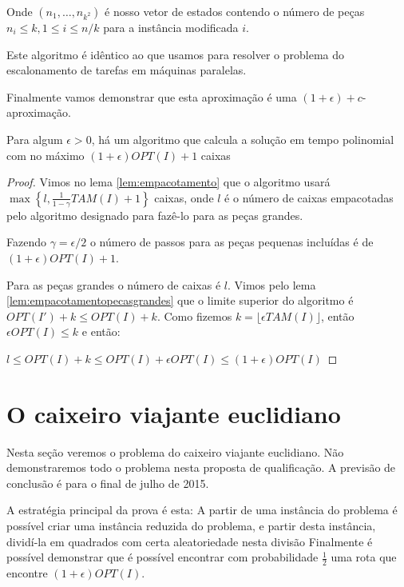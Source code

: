 Onde $(n_1, \ldots, n_{k^2})$ é nosso vetor de estados contendo o número de peças $n_i \leq k, 1 \leq i \leq n/k$ para a instância modificada $i$.

Este algoritmo é idêntico ao que usamos para resolver o problema do escalonamento de tarefas em máquinas paralelas.

Finalmente vamos demonstrar que esta aproximação é uma $(1+\epsilon) + c$-aproximação.

\begin{teorema}
Para algum $\epsilon > 0$, há um algoritmo que calcula a solução em tempo polinomial com no máximo $(1 + \epsilon) OPT(I) + 1$ caixas
\end{teorema}

\begin{proof}
Vimos no lema \ref{lem:empacotamento} que o algoritmo usará  $\max \left\{ l,\frac{1}{1-\gamma} TAM(I) + 1\right\}$ caixas, onde $l$ é o número de caixas empacotadas pelo algoritmo designado para fazê-lo para as peças grandes.

Fazendo $\gamma = \epsilon/2$ o número de passos para as peças pequenas incluídas é de $(1 + \epsilon) OPT(I) + 1$.

Para as peças grandes o número de caixas é $l$. Vimos pelo lema \ref{lem:empacotamentopecasgrandes} que o limite superior do algoritmo é $OPT(I')+k \leq OPT(I)+k$. Como fizemos $k = \lfloor \epsilon TAM(I) \rfloor$, então $ \epsilon OPT(I) \leq k $ e então:

$l \leq OPT(I)+k \leq OPT(I) + \epsilon OPT(I) \leq (1 + \epsilon) OPT(I)$

\end{proof}

\section{O caixeiro viajante euclidiano}

Nesta seção veremos o problema do caixeiro viajante euclidiano. Não demonstraremos todo o problema nesta proposta de qualificação. A previsão de conclusão é para o final de julho de 2015.

A estratégia principal da prova é esta: A partir de uma instância do problema é possível criar uma instância reduzida do problema, e partir desta instância, dividí-la em quadrados com certa aleatoriedade nesta divisão Finalmente é possível demonstrar \cite{Williamson} que é possível encontrar com probabilidade $\frac{1}{2}$ uma rota que encontre $(1 + \epsilon) OPT(I)$.

